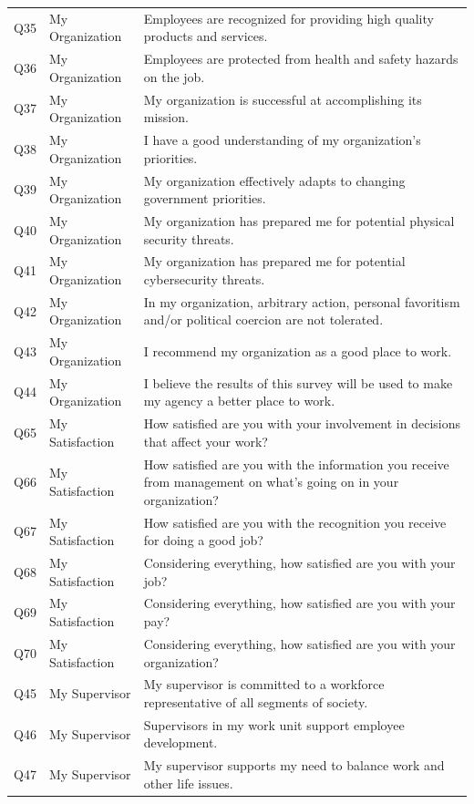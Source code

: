 \documentclass[
  man]{apa7}
\newenvironment{lltable}{\begin{landscape}\centering\begin{ThreePartTable}}{\end{ThreePartTable}\end{landscape}}
\begin{document}
\begin{lltable}
{\begin{longtable}{lll}
Q35 & My Organization & Employees are recognized for providing high quality products and services.\\
Q36 & My Organization & Employees are protected from health and safety hazards on the job.\\
Q37 & My Organization & My organization is successful at accomplishing its mission.\\
Q38 & My Organization & I have a good understanding of my organization’s priorities.\\
Q39 & My Organization & My organization effectively adapts to changing government priorities.\\
Q40 & My Organization & My organization has prepared me for potential physical security threats.\\
Q41 & My Organization & My organization has prepared me for potential cybersecurity threats.\\
Q42 & My Organization & In my organization, arbitrary action, personal favoritism and/or political coercion are not tolerated.\\
Q43 & My Organization & I recommend my organization as a good place to work.\\
Q44 & My Organization & I believe the results of this survey will be used to make my agency a better place to work.\\
Q65 & My Satisfaction & How satisfied are you with your involvement in decisions that affect your work?\\
Q66 & My Satisfaction & How satisfied are you with the information you receive from management on what's going on in your organization?\\
Q67 & My Satisfaction & How satisfied are you with the recognition you receive for doing a good job?\\
Q68 & My Satisfaction & Considering everything, how satisfied are you with your job?\\
Q69 & My Satisfaction & Considering everything, how satisfied are you with your pay?\\
Q70 & My Satisfaction & Considering everything, how satisfied are you with your organization?\\
Q45 & My Supervisor & My supervisor is committed to a workforce representative of all segments of society.\\
Q46 & My Supervisor & Supervisors in my work unit support employee development.\\
Q47 & My Supervisor & My supervisor supports my need to balance work and other life issues.\\

\end{longtable}}
\end{lltable}
\end{document}
